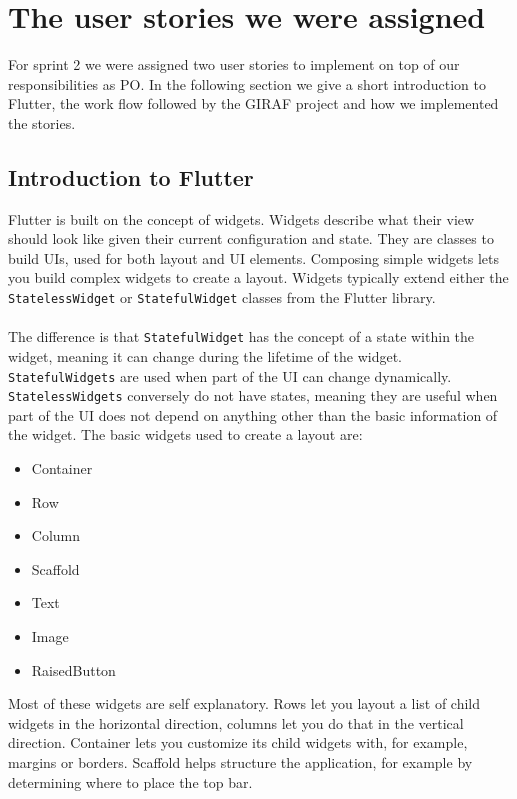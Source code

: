 \section{The user stories we were assigned}
For sprint 2 we were assigned two user stories to implement on top of our responsibilities as PO.
In the following section we give a short introduction to Flutter, the work flow followed by the GIRAF project and how we implemented the stories.

\subsection{Introduction to Flutter}
Flutter is built on the concept of widgets.
Widgets describe what their view should look like given their current configuration and state\cite{Flutterwidget}. 
They are classes to build UIs, used for both layout and UI elements.
Composing simple widgets lets you build complex widgets to create a layout\cite{Flutterlayout}.
Widgets typically extend either the \texttt{StatelessWidget} or \texttt{StatefulWidget} classes from the Flutter library.
\\\\
The difference is that \texttt{StatefulWidget} has the concept of a state within the widget, meaning it can change during the lifetime of the widget.
\texttt{StatefulWidgets} are used when part of the UI can change dynamically.
\texttt{StatelessWidgets} conversely do not have states, meaning they are useful when part of the UI does not depend on anything other than the basic information of the widget. 
The basic widgets used to create a layout are\cite{FlutterBasicWidgets}:
 \begin{itemize}
    \item Container
    \item Row
    \item Column  
    \item Scaffold
    \item Text
    \item Image
    \item RaisedButton 
 \end{itemize} 
Most of these widgets are self explanatory. 
Rows let you layout a list of child widgets in the horizontal direction, columns let you do that in the vertical direction.
Container lets you customize its child widgets with, for example, margins or borders.
Scaffold helps structure the application, for example by determining where to place the top bar.

